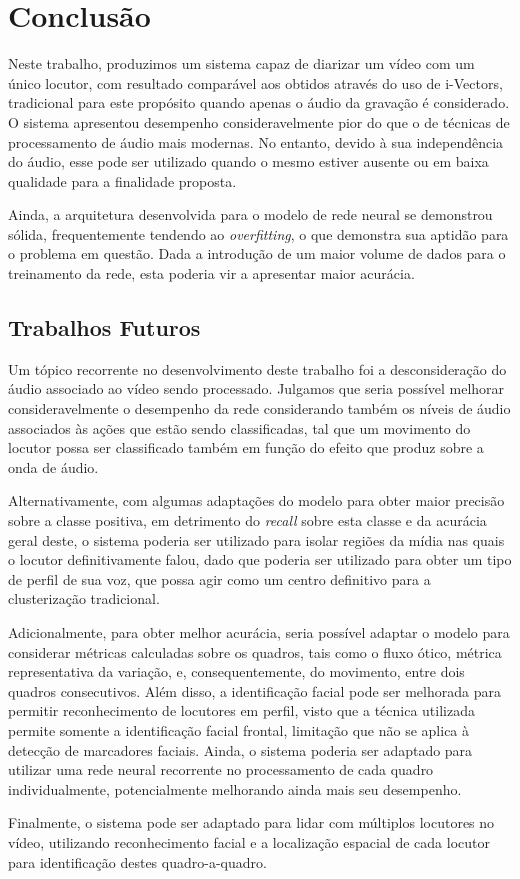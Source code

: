 \chapter{Conclusão}

Neste trabalho, produzimos um sistema capaz de diarizar um vídeo com um único locutor, com resultado comparável aos obtidos através do uso de i-Vectors, tradicional para este propósito quando apenas o áudio da gravação é considerado.
O sistema apresentou desempenho consideravelmente pior do que o de técnicas de processamento de áudio mais modernas.
No entanto, devido à sua independência do áudio, esse pode ser utilizado quando o mesmo estiver ausente ou em baixa qualidade para a finalidade proposta.

Ainda, a arquitetura desenvolvida para o modelo de rede neural se demonstrou sólida, frequentemente tendendo ao \textit{overfitting}, o que demonstra sua aptidão para o problema em questão.
Dada a introdução de um maior volume de dados para o treinamento da rede, esta poderia vir a apresentar maior acurácia.

\section{Trabalhos Futuros}

Um tópico recorrente no desenvolvimento deste trabalho foi a desconsideração do áudio associado ao vídeo sendo processado.
Julgamos que seria possível melhorar consideravelmente o desempenho da rede considerando também os níveis de áudio associados às ações que estão sendo classificadas, tal que um movimento do locutor possa ser classificado também em função do efeito que produz sobre a onda de áudio.

Alternativamente, com algumas adaptações do modelo para obter maior precisão sobre a classe positiva, em detrimento do \textit{recall} sobre esta classe e da acurácia geral deste, o sistema poderia ser utilizado para isolar regiões da mídia nas quais o locutor definitivamente falou, dado que poderia ser utilizado para obter um tipo de perfil de sua voz, que possa agir como um centro definitivo para a clusterização tradicional.

Adicionalmente, para obter melhor acurácia, seria possível adaptar o modelo para considerar métricas calculadas sobre os quadros, tais como o fluxo ótico, métrica representativa da variação, e, consequentemente, do movimento, entre dois quadros consecutivos.
Além disso, a identificação facial pode ser melhorada para permitir reconhecimento de locutores em perfil, visto que a técnica utilizada permite somente a identificação facial frontal, limitação que não se aplica à detecção de marcadores faciais.
Ainda, o sistema poderia ser adaptado para utilizar uma rede neural recorrente no processamento de cada quadro individualmente, potencialmente melhorando ainda mais seu desempenho.

Finalmente, o sistema pode ser adaptado para lidar com múltiplos locutores no vídeo, utilizando reconhecimento facial e a localização espacial de cada locutor para identificação destes quadro-a-quadro.
